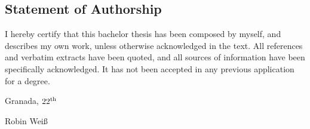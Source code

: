 \thispagestyle{empty}

\subsection*{Statement of Authorship}
I hereby certify that this bachelor thesis has been composed by myself, and describes my own work, unless otherwise acknowledged in the text. All references and verbatim extracts have been quoted, and all sources of information have been specifically acknowledged. It has not been accepted in any previous application for a degree.

\vspace{1cm}

\noindent 
Granada, $\the\day^{\text{th}}$ \monthname \: \the\year

\vspace{2cm}

\noindent
Robin Weiß
